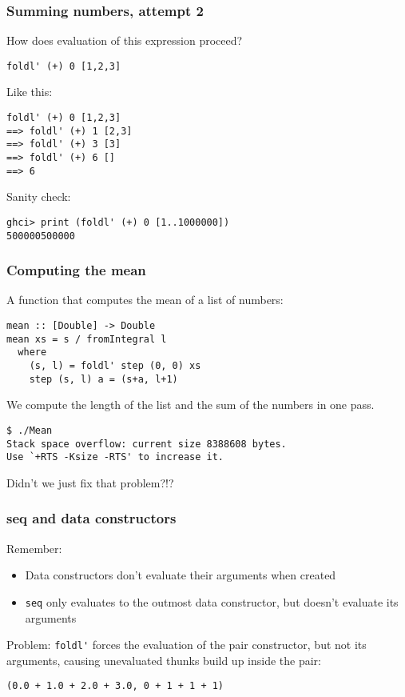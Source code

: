 \documentclass{beamer}
\begin{document}
\begin{frame}[fragile]
  \frametitle{Summing numbers, attempt 2}

  How does evaluation of this expression proceed?
\begin{verbatim}
foldl' (+) 0 [1,2,3]
\end{verbatim}

  Like this:
\begin{verbatim}
foldl' (+) 0 [1,2,3]
==> foldl' (+) 1 [2,3]
==> foldl' (+) 3 [3]
==> foldl' (+) 6 []
==> 6
\end{verbatim}

  Sanity check:
\begin{verbatim}
ghci> print (foldl' (+) 0 [1..1000000])
500000500000
\end{verbatim}
\end{frame}

\begin{frame}[fragile]
  \frametitle{Computing the mean}

  A function that computes the mean of a list of numbers:
  \begin{lstlisting}
mean :: [Double] -> Double
mean xs = s / fromIntegral l
  where
    (s, l) = foldl' step (0, 0) xs
    step (s, l) a = (s+a, l+1)
  \end{lstlisting}
  We compute the length of the list and the sum of the numbers in one
  pass.

\begin{verbatim}
$ ./Mean
Stack space overflow: current size 8388608 bytes.
Use `+RTS -Ksize -RTS' to increase it.
\end{verbatim}
Didn't we just fix that problem?!?
\end{frame}

\begin{frame}[fragile]
  \frametitle{seq and data constructors}

  Remember:
  \begin{itemize}
  \item Data constructors don't evaluate their arguments when
    created
  \item \lstinline!seq! only evaluates to the outmost data
    constructor, but doesn't evaluate its arguments
  \end{itemize}

  Problem: \lstinline!foldl'! forces the evaluation of the pair
  constructor, but not its arguments, causing unevaluated thunks build
  up inside the pair:

\begin{verbatim}
(0.0 + 1.0 + 2.0 + 3.0, 0 + 1 + 1 + 1)
\end{verbatim}
\end{frame}
\end{document}
